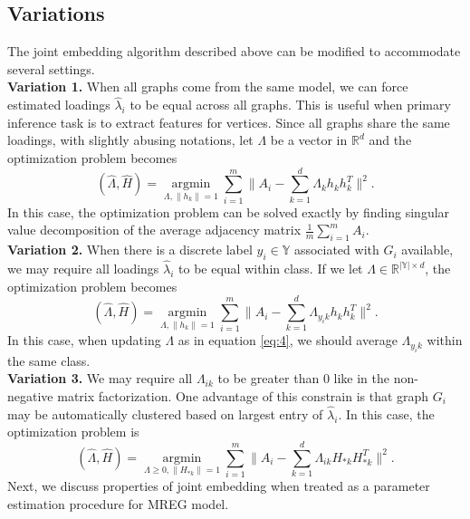 \documentclass[10pt,journal,compsoc]{IEEEtran}
\begin{document}
\subsection{Variations}
The joint embedding algorithm described above can be modified to accommodate several settings. \\
\textbf{Variation 1.} When all graphs come from the same model, we can force estimated loadings $\hat{\lambda}_i$ to be equal across all graphs. This is useful when primary inference task is to extract features for vertices. Since all graphs share the same loadings, with slightly abusing notations, let $\Lambda$ be a vector in $\mathbb{R}^d$ and the optimization problem becomes
\[ (\hat{\Lambda},\hat{H}) = \underset{\Lambda,\|h_k\|=1}{\operatorname{argmin}} \sum\limits_{i=1}^{m} \| A_i- \sum\limits_{k=1}^{d} \Lambda_{k} h_k h_k^T \|  ^2.  \] 
In this case, the optimization problem can be solved exactly by finding singular value decomposition of the average adjacency matrix $\frac{1}{m}\sum\limits_{i=1}^{m}A_i$. \\
\textbf{Variation 2.} When there is a discrete label $y_i \in \mathbb{Y}$ associated with $G_i$ available, we may require all loadings $\hat{\lambda}_i$ to be equal within class. If we let $\Lambda \in \mathbb{R}^{|\mathbb{Y}| \times d}$, the optimization problem becomes
\[ (\hat{\Lambda},\hat{H}) = \underset{\Lambda,\|h_k\|=1}{\operatorname{argmin}} \sum\limits_{i=1}^{m} \| A_i- \sum\limits_{k=1}^{d} \Lambda_{y_i k} h_k h_k ^T \|  ^2.  \] 
In this case, when updating $\Lambda$ as in equation \ref{eq:4}, we should average $\Lambda_{y_i k}$ within the same class. \\
\textbf{Variation 3.} We may require all $\Lambda_{ik}$ to be greater than $0$ like in the non-negative matrix factorization. One advantage of this constrain is that graph $G_i$ may be automatically clustered  based on largest entry of $\hat{\lambda}_{i}$. In this case, the optimization problem is
\[ (\hat{\Lambda},\hat{H}) = \underset{\Lambda \geq 0,\|H_{*k}\|=1}{\operatorname{argmin}} \sum\limits_{i=1}^{m} \| A_i- \sum\limits_{k=1}^{d} \Lambda_{ik} H_{*k} H_{*k}^T \|  ^2.  \] 
Next, we discuss properties of joint embedding when treated as a parameter estimation procedure for MREG model.
\end{document}
